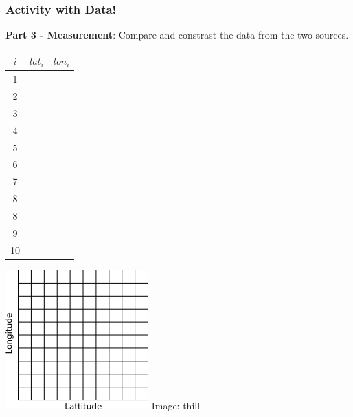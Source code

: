 \documentclass[fleqn]{beamer} %
\newcommand{\sectiontitleIV}{Activity with Data!}
\begin{document}
	\begin{frame}[label=sectionIV]
		\frametitle{\sectiontitleIV}
		\scriptsize
		{\bf Part 3 - Measurement}: Compare and constrast the data from the two sources.  \vspc
		
		\begin{multicols}{2}

			\begin{tabular}{|c|c|c|}
			$i$ & $lat_i$ & $lon_i$ \\\hline
			  1  & &              \\ \hline
			  2  & &              \\ \hline
			  3  & &              \\ \hline
			  4  & &              \\ \hline
			  5  & &              \\ \hline
			  6  & &              \\ \hline
			  7  & &              \\ \hline
			  8  & &              \\ \hline
			  8  & &              \\ \hline		
			  9  & &              \\ \hline
             10  & &              \\ \hline
			\end{tabular}

			\includegraphics[scale=1]{lat_lon_grid.png}
			{\tiny Image: thill}
		\end{multicols}	

	\end{frame}
\end{document}
